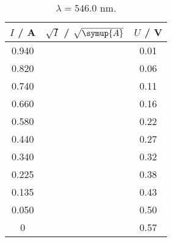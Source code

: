 \begin{table}[h]
    \begin{minipage}[b]{80mm}
        \begin{tabular}{c c c}
            \toprule
            { $I$ / A} & {$\sqrt{I}$ / $\sqrt{\symup{A}}$} & {$U$ / V} \\
            \midrule
               0.940 & & 0.01 \\
               0.820 & & 0.06 \\
               0.740 & & 0.11 \\
               0.660 & & 0.16 \\
               0.580 & & 0.22 \\
               0.440 & & 0.27 \\
               0.340 & & 0.32 \\
               0.225 & & 0.38 \\
               0.135 & & 0.43 \\
               0.050 & & 0.50 \\
               0     & & 0.57 \\
            \bottomrule
        \end{tabular}
        \caption{$\lambda = 546.0$ nm.} 
    \end{minipage}
\end{table}